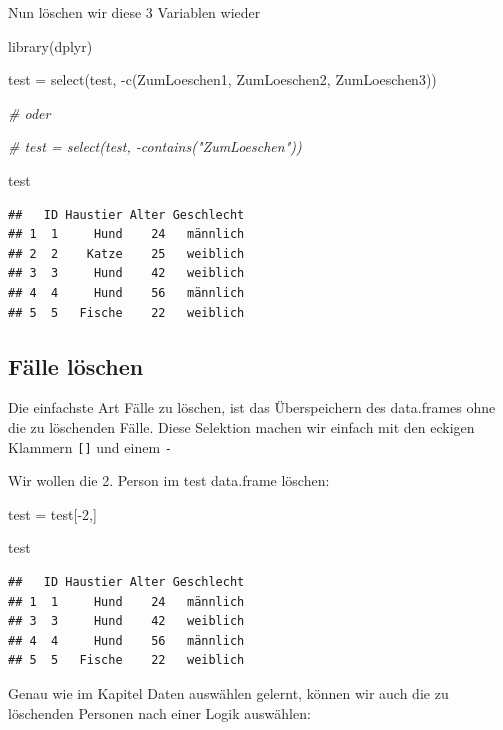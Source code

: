 \documentclass[
]{book}
\newenvironment{Shaded}{\begin{snugshade}}{\end{snugshade}}
\newcommand{\CommentTok}[1]{\textcolor[rgb]{0.56,0.35,0.01}{\textit{#1}}}
\newcommand{\DecValTok}[1]{\textcolor[rgb]{0.00,0.00,0.81}{#1}}
\newcommand{\FunctionTok}[1]{\textcolor[rgb]{0.00,0.00,0.00}{#1}}
\newcommand{\NormalTok}[1]{#1}
\newcommand{\OtherTok}[1]{\textcolor[rgb]{0.56,0.35,0.01}{#1}}
\newcommand{\SpecialCharTok}[1]{\textcolor[rgb]{0.00,0.00,0.00}{#1}}
\begin{document}
Nun löschen wir diese 3 Variablen wieder

\begin{Shaded}
\begin{Highlighting}[]
\FunctionTok{library}\NormalTok{(dplyr)}

\NormalTok{test }\OtherTok{=} \FunctionTok{select}\NormalTok{(test, }\SpecialCharTok{{-}}\FunctionTok{c}\NormalTok{(ZumLoeschen1, ZumLoeschen2, ZumLoeschen3))}

\CommentTok{\# oder }

\CommentTok{\# test = select(test, {-}contains("ZumLoeschen"))}

\NormalTok{test}
\end{Highlighting}
\end{Shaded}

\begin{verbatim}
##   ID Haustier Alter Geschlecht
## 1  1     Hund    24   männlich
## 2  2    Katze    25   weiblich
## 3  3     Hund    42   weiblich
## 4  4     Hund    56   männlich
## 5  5   Fische    22   weiblich
\end{verbatim}

\hypertarget{fuxe4lle-luxf6schen}{%
\subsection{Fälle löschen}\label{fuxe4lle-luxf6schen}}

Die einfachste Art Fälle zu löschen, ist das Überspeichern des data.frames ohne die zu löschenden Fälle. Diese Selektion machen wir einfach mit den eckigen Klammern \texttt{{[}{]}} und einem \texttt{-}

Wir wollen die 2. Person im test data.frame löschen:

\begin{Shaded}
\begin{Highlighting}[]
\NormalTok{test }\OtherTok{=}\NormalTok{ test[}\SpecialCharTok{{-}}\DecValTok{2}\NormalTok{,]}

\NormalTok{test}
\end{Highlighting}
\end{Shaded}

\begin{verbatim}
##   ID Haustier Alter Geschlecht
## 1  1     Hund    24   männlich
## 3  3     Hund    42   weiblich
## 4  4     Hund    56   männlich
## 5  5   Fische    22   weiblich
\end{verbatim}

Genau wie im Kapitel Daten auswählen gelernt, können wir auch die zu löschenden Personen nach einer Logik auswählen:
\end{document}
